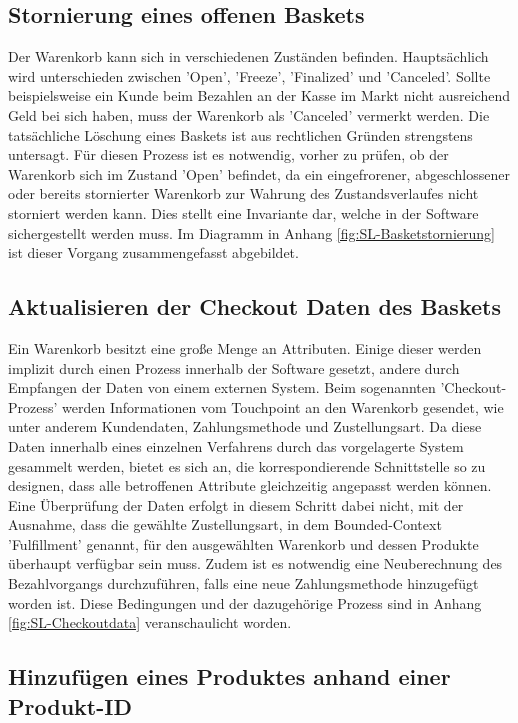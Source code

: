 \subsection{Stornierung eines offenen Baskets}

Der Warenkorb kann sich in verschiedenen Zuständen befinden. Hauptsächlich wird unterschieden zwischen 'Open', 'Freeze', 'Finalized' und 'Canceled'. Sollte beispielsweise ein Kunde beim Bezahlen an der Kasse im Markt nicht ausreichend Geld bei sich haben, muss der Warenkorb als 'Canceled' vermerkt werden. Die tatsächliche Löschung eines Baskets ist aus rechtlichen Gründen strengstens untersagt. Für diesen Prozess ist es notwendig, vorher zu prüfen, ob der Warenkorb sich im Zustand 'Open' befindet, da ein eingefrorener, abgeschlossener oder bereits stornierter Warenkorb zur Wahrung des Zustandsverlaufes nicht storniert werden kann. Dies stellt eine Invariante dar, welche in der Software sichergestellt werden muss. Im Diagramm in Anhang \ref{fig:SL-Basketstornierung} ist dieser Vorgang zusammengefasst abgebildet.

\subsection{Aktualisieren der Checkout Daten des Baskets}

Ein Warenkorb besitzt eine große Menge an Attributen. Einige dieser werden implizit durch einen Prozess innerhalb der Software gesetzt, andere durch Empfangen der Daten von einem externen System. Beim sogenannten 'Checkout-Prozess' werden Informationen vom Touchpoint an den Warenkorb gesendet, wie unter anderem Kundendaten, Zahlungsmethode und Zustellungsart. Da diese Daten innerhalb eines einzelnen Verfahrens durch das vorgelagerte System gesammelt werden, bietet es sich an, die korrespondierende Schnittstelle so zu designen, dass alle betroffenen Attribute gleichzeitig angepasst werden können. Eine Überprüfung der Daten erfolgt in diesem Schritt dabei nicht, mit der Ausnahme, dass die gewählte Zustellungsart, in dem Bounded-Context 'Fulfillment' genannt, für den ausgewählten Warenkorb und dessen Produkte überhaupt verfügbar sein muss. Zudem ist es notwendig eine Neuberechnung des Bezahlvorgangs durchzuführen, falls eine neue Zahlungsmethode hinzugefügt worden ist. Diese Bedingungen und der dazugehörige Prozess sind in Anhang \ref{fig:SL-Checkoutdata} veranschaulicht worden.

\subsection{Hinzufügen eines Produktes anhand einer Produkt-ID}

